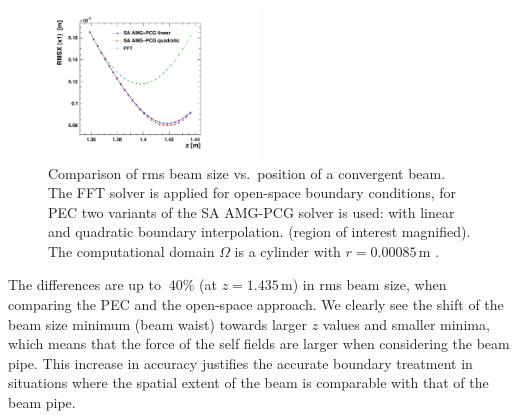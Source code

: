\begin{figure}[ht]
  \begin{center}
    \includegraphics[width=0.5\textwidth]{figures/fft-drift-mg-drift-small-RMSX-x-SPOS}
    \caption{Comparison of rms beam size vs.\ position of a convergent
      beam. The FFT solver is applied for open-space boundary
      conditions, for PEC two variants of the SA AMG-PCG solver is used:
      with linear and quadratic boundary interpolation.  (region of
      interest magnified). The computational domain $\Omega$ is a
      cylinder with $r=0.00085$\,m \label{fig:vareps}.}
  \end{center} 
\end{figure}


The differences are up to $~40\%$ (at $z=1.435$\,m) in rms beam size,
when comparing the PEC and the open-space approach. We clearly see the
shift of the beam size minimum (beam waist) towards larger $z$ values
and smaller minima, which means that the force of the self fields are
larger when considering the beam pipe.
This increase in accuracy justifies the 
accurate boundary treatment in situations where the spatial extent of
the beam is comparable with that of the beam pipe.


